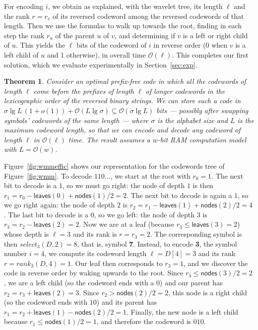 \documentclass[preprint,12pt]{elsarticle}
\newcommand{\Oh}[1]{\ensuremath{\mathcal{O}\!\left({#1}\right)}}
\newcommand{\nodes}{\ensuremath{\mathsf{nodes}}}
\newcommand{\leaves}{\ensuremath{\mathsf{leaves}}}
\renewcommand{\log}{\lg}
\newtheorem{theorem}{Theorem}
\begin{document}
For encoding $i$, we obtain as explained, with the wavelet tree, its length 
$\ell$ and the rank $r=r_v$ of its reversed codeword among the reversed
codewords of that length. Then we use the formulas to walk up towards the
root, finding in each step the rank $r_u$ of the parent $u$ of $v$, and
determining if $v$ is a left or right child of $u$. This yields the $\ell$
bits of the codeword of $i$ in reverse order (0 when $v$ is a left child of
$u$ and 1 otherwise), in overall time $\Oh{\ell}$. This completes our first
solution, which we evaluate experimentally in Section~\ref{sec:exp}.

\begin{theorem}
\label{thm:matrices0}
Consider an optimal prefix-free code in which all the codewords of length 
$\ell$ come before the prefixes of length $\ell$ of longer codewords in the 
lexicographic order of the reversed binary strings.
We can store such a code in $\sigma\lg L\,(1+o(1)) + \Oh{L\lg\sigma} \subseteq \Oh{\sigma \log L}$ bits --- possibly after swapping symbols' codewords of the same length --- where $\sigma$ is the alphabet size and $L$ is the maximum codeword length, so that we can encode and decode any codeword of length $\ell$ in 
$\Oh{\ell}$ time.
The result assumes a $w$-bit RAM computation model with $L=\Oh{w}$.
\end{theorem}

Figure~\ref{fig:wmmeffic} shows our representation for the codewords tree of
Figure~\ref{fig:wmm}. To decode $110...$, we start at the root with $r_0=1$.
The next bit to decode is a $1$, so we must go right: the node of depth $1$ is
then $r_1 = r_0-\leaves(0)+\nodes(1)/2 = 2$. The next bit to decode is again
a $1$, so we go right again: the node of depth $2$ is $r_2 = r_1 - \leaves(1)+
\nodes(2)/2 = 4$. The last bit to decode is a $0$, so we go left: the node of
depth $3$ is $r_3 = r_2 - \leaves(2) = 2$. Now we are at a leaf (because
$r_3 \le \leaves(3)=2$) whose depth is $\ell=3$ and its rank is $r=r_3=2$. The 
corresponding symbol is then $select_3(D,2)=8$, that is, symbol {\bf 7}. 
Instead, to encode {\bf 3}, the symbol number $i=4$, we compute its codeword 
length $\ell=D[4]=3$ and its rank $r=rank_3(D,4)=1$. Our leaf then corresponds 
to $r_3=1$, and we discover the code in reverse order by waking upwards to the 
root. Since $r_3 \le \nodes(3)/2=2$, we are a left child (so the codeword ends
with a $0$) and our parent has $r_2 = r_3 + \leaves(2) = 3$. Since $r_2 >
\nodes(2)/2 = 2$, this node is a right child (so the codeword ends with $10$)
and its parent has $r_1 = r_2+\leaves(1)-\nodes(2)/2 = 1$. Finally, the new
node is a left child because $r_1 \le \nodes(1)/2=1$, and therefore the
codeword is $010$.
\end{document}

